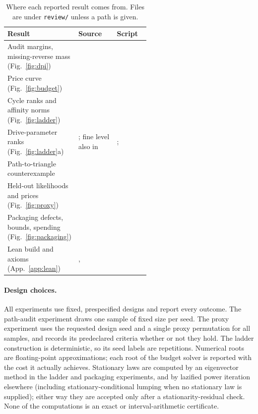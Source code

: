 \begin{table}[htbp]
\centering
\small
\renewcommand{\arraystretch}{1.12}
\caption{Where each reported result comes from. Files are under \texttt{review/} unless a path is given.}
\label{tab:evidence}
\begin{tabularx}{\linewidth}{L{0.30\linewidth}L{0.27\linewidth}Y}
\toprule
Result & Source & Script \\
\midrule
Audit margins, missing-reverse mass (Fig.~\ref{fig:dpi}) &  &  \\
Price curve (Fig.~\ref{fig:budget}) &  &  \\
Cycle ranks and affinity norms (Fig.~\ref{fig:ladder}) &  &  \\
Drive-parameter ranks (Fig.~\ref{fig:ladder}a) & ; fine level also in  & ;  \\
Path-to-triangle counterexample &  &  \\
Held-out likelihoods and prices (Fig.~\ref{fig:proxy}) &  &  \\
Packaging defects, bounds, spending (Fig.~\ref{fig:packaging}) &  &  \\
Lean build and axioms (App.~\ref{app:lean}) & ,  &  \\
\bottomrule
\end{tabularx}
\end{table}

\paragraph{Design choices.} All experiments use fixed, prespecified designs and report every outcome. The path-audit experiment draws one sample of fixed size per seed. The proxy experiment uses the requested design seed and a single proxy permutation for all samples, and records its predeclared criteria whether or not they hold. The ladder construction is deterministic, so its seed labels are repetitions. Numerical roots are floating-point approximations; each root of the budget solver is reported with the cost it actually achieves. Stationary laws are computed by an eigenvector method in the ladder and packaging experiments, and by lazified power iteration elsewhere (including stationary-conditional lumping when no stationary law is supplied); either way they are accepted only after a stationarity-residual check. None of the computations is an exact or interval-arithmetic certificate.
